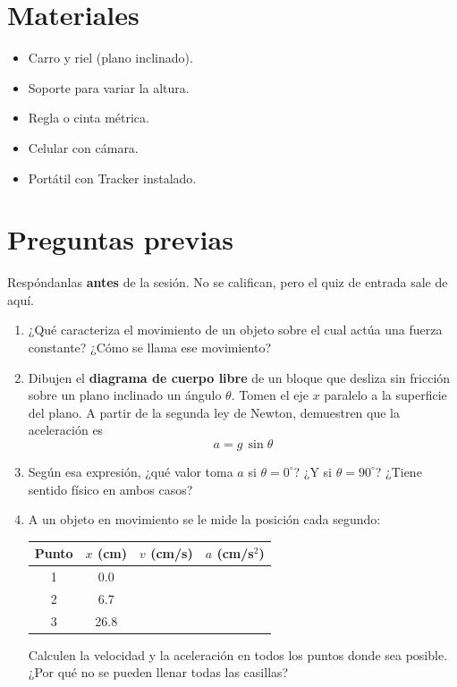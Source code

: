 \documentclass[11pt, letterpaper]{article}
\begin{document}
	\section{Materiales}
	\begin{itemize}
		\item Carro y riel (plano inclinado).
		\item Soporte para variar la altura.
		\item Regla o cinta métrica.
		\item Celular con cámara.
		\item Portátil con Tracker instalado.
	\end{itemize}
	
	\section{Preguntas previas}
	
	Respóndanlas \textbf{antes} de la sesión. No se califican, pero
	el quiz de entrada sale de aquí.
	
	\begin{enumerate}
		\item ¿Qué caracteriza el movimiento de un objeto sobre el cual actúa una
		fuerza constante? ¿Cómo se llama ese movimiento?
		
		\item Dibujen el \textbf{diagrama de cuerpo libre} de un bloque que desliza
		sin fricción sobre un plano inclinado un ángulo $\theta$. Tomen el eje $x$
		paralelo a la superficie del plano. A partir de la segunda ley de Newton,
		demuestren que la aceleración es
		\[
		a = g\,\sin\theta
		\]
		
		\item Según esa expresión, ¿qué valor toma $a$ si $\theta = 0^\circ$?
		¿Y si $\theta = 90^\circ$? ¿Tiene sentido físico en ambos casos?
		
		\item A un objeto en movimiento se le mide la posición cada segundo:
		
		\begin{center}
			\small
			\begin{tabular}{|c|c|c|c|}
				\hline
				Punto & $x$ (cm) & $v$ (cm/s) & $a$ (cm/s$^2$) \\
				\hline
				1 & 0.0 & & \\ \hline
				2 & 6.7 & & \\ \hline
				3 & 26.8 & & \\ \hline
			\end{tabular}
		\end{center}
		
		Calculen la velocidad y la aceleración en todos los puntos donde sea
		posible. ¿Por qué no se pueden llenar todas las casillas?
	\end{enumerate}
	
\end{document}
